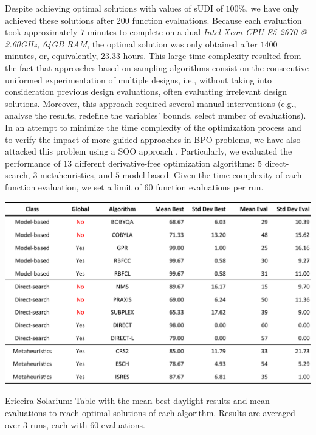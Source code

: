 Despite achieving optimal solutions with values of sUDI of $100\%$, we have only achieved these solutions after 200 function evaluations. Because each evaluation took approximately $7$ minutes to complete on a dual \textit{Intel Xeon CPU E5-2670 @ 2.60GHz, 64GB RAM}, the optimal solution was only obtained after $1400$ minutes, or, equivalently, $23.33$ hours. This large time complexity resulted from the fact that approaches based on sampling algorithms consist on the consecutive uniformed experimentation of multiple designs, i.e., without taking into consideration previous design evaluations, often evaluating irrelevant design solutions. Moreover, this approach required several manual interventions (e.g., analyse the results, redefine the variables' bounds, select number of evaluations). In an attempt to minimize the time complexity of the optimization process and to verify the impact of more guided approaches in \ac{BPO} problems, we have also attacked this problem using a \ac{SOO} approach \cite{Belem2018optimizeddesign}. Particularly, we evaluated the performance of $13$ different derivative-free optimization algorithms: $5$ direct-search, $3$ metaheuristics, and $5$ model-based. Given the time complexity of each function evaluation, we set a limit of $60$ function evaluations per run.

\begin{table}[htbp]
	\centering
	\includegraphics[width=\textwidth]{tables_and_code/Ericeira_phase1_stats_v1.pdf}
	\caption[Ericeira Solarium: Mean best results and evaluations discriminated per algorithm]{Ericeira Solarium: Table with the mean best daylight results and mean evaluations to reach optimal solutions of each algorithm. Results are averaged over $3$ runs, each with $60$ evaluations.}
	\label{table:phase1results}
\end{table}

